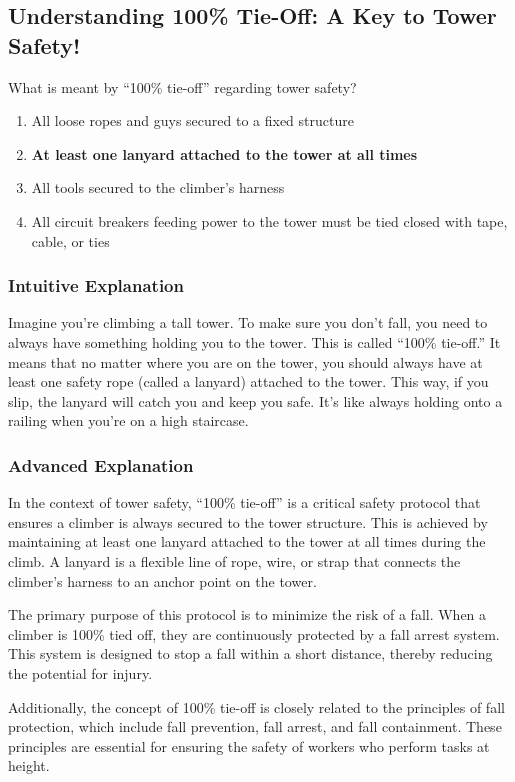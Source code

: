 \subsection{Understanding 100\% Tie-Off: A Key to Tower Safety!}

\begin{tcolorbox}[colback=gray!10!white,colframe=black!75!black,title=E0A07] What is meant by “100\% tie-off” regarding tower safety?
    \begin{enumerate}[label=\Alph*,noitemsep]
        \item All loose ropes and guys secured to a fixed structure
        \item \textbf{At least one lanyard attached to the tower at all times}
        \item All tools secured to the climber’s harness
        \item All circuit breakers feeding power to the tower must be tied closed with tape, cable, or ties
    \end{enumerate}
\end{tcolorbox}

\subsubsection{Intuitive Explanation}
Imagine you’re climbing a tall tower. To make sure you don’t fall, you need to always have something holding you to the tower. This is called “100\% tie-off.” It means that no matter where you are on the tower, you should always have at least one safety rope (called a lanyard) attached to the tower. This way, if you slip, the lanyard will catch you and keep you safe. It’s like always holding onto a railing when you’re on a high staircase.

\subsubsection{Advanced Explanation}
In the context of tower safety, “100\% tie-off” is a critical safety protocol that ensures a climber is always secured to the tower structure. This is achieved by maintaining at least one lanyard attached to the tower at all times during the climb. A lanyard is a flexible line of rope, wire, or strap that connects the climber’s harness to an anchor point on the tower. 

The primary purpose of this protocol is to minimize the risk of a fall. When a climber is 100\% tied off, they are continuously protected by a fall arrest system. This system is designed to stop a fall within a short distance, thereby reducing the potential for injury. 


Additionally, the concept of 100\% tie-off is closely related to the principles of fall protection, which include fall prevention, fall arrest, and fall containment. These principles are essential for ensuring the safety of workers who perform tasks at height.

